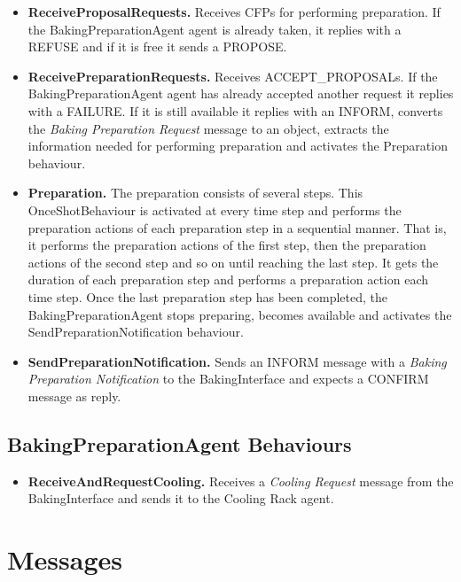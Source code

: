 \documentclass[paper=a4, fontsize=11pt]{scrartcl}
\begin{document}
		\begin{itemize}
			\item \textbf{ReceiveProposalRequests.} Receives CFPs for performing preparation. If the BakingPreparationAgent agent is already taken, it replies with a REFUSE and if it is free it sends a PROPOSE.

			\item \textbf{ReceivePreparationRequests.} Receives ACCEPT\_PROPOSALs.  If the BakingPreparationAgent agent has already accepted another request it replies with a FAILURE. If it is still available it replies with an INFORM, converts the \textit{Baking Preparation Request} message to an object, extracts the information needed for performing preparation and activates the Preparation behaviour.

			\item \textbf{Preparation.} The preparation consists of several steps. This OnceShotBehaviour is activated at every time step and performs the preparation actions of each preparation step in a sequential manner. That is, it performs the preparation actions of the first step, then the preparation actions of the second step and so on until reaching the last step. It gets the duration of each preparation step and performs a preparation action each time step. Once the last preparation step has been completed, the BakingPreparationAgent stops preparing, becomes available and activates the SendPreparationNotification behaviour.

			\item \textbf{SendPreparationNotification.} Sends an INFORM message with a \textit{Baking Preparation Notification} to the BakingInterface and expects a CONFIRM message as reply.
		\end{itemize}

		\subsection*{BakingPreparationAgent Behaviours}

		\begin{itemize}
			\item \textbf{ReceiveAndRequestCooling.} Receives a \textit{Cooling Request} message from the BakingInterface and sends it to the Cooling Rack agent.
		\end{itemize}


	\section{Messages}
\end{document}
